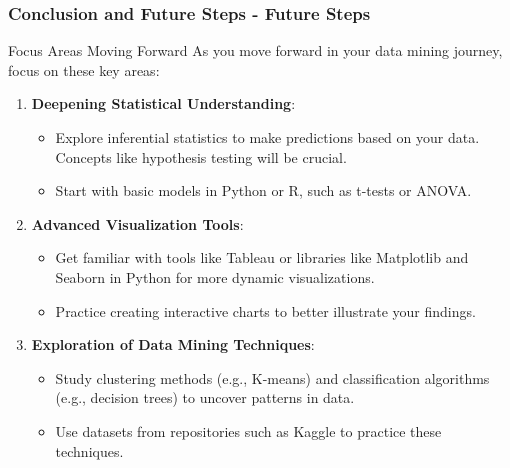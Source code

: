 \documentclass[aspectratio=169]{beamer}
\begin{document}
\begin{frame}[fragile]
    \frametitle{Conclusion and Future Steps - Future Steps}
    \begin{block}{Focus Areas Moving Forward}
        As you move forward in your data mining journey, focus on these key areas:
    \end{block}
    
    \begin{enumerate}
        \item \textbf{Deepening Statistical Understanding}:
        \begin{itemize}
            \item Explore inferential statistics to make predictions based on your data. Concepts like hypothesis testing will be crucial.
            \item Start with basic models in Python or R, such as t-tests or ANOVA.
        \end{itemize}

        \item \textbf{Advanced Visualization Tools}:
        \begin{itemize}
            \item Get familiar with tools like Tableau or libraries like Matplotlib and Seaborn in Python for more dynamic visualizations.
            \item Practice creating interactive charts to better illustrate your findings.
        \end{itemize}

        \item \textbf{Exploration of Data Mining Techniques}:
        \begin{itemize}
            \item Study clustering methods (e.g., K-means) and classification algorithms (e.g., decision trees) to uncover patterns in data.
            \item Use datasets from repositories such as Kaggle to practice these techniques.
        \end{itemize}
    \end{enumerate}
\end{frame}
\end{document}
